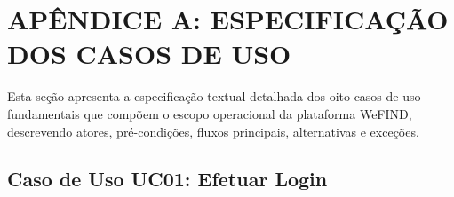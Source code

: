 \section*{APÊNDICE A: ESPECIFICAÇÃO DOS CASOS DE USO}

Esta seção apresenta a especificação textual detalhada dos oito casos de uso fundamentais que compõem o escopo operacional da plataforma WeFIND, descrevendo atores, pré-condições, fluxos principais, alternativas e exceções.

\vspace{0.5cm}

\subsection*{Caso de Uso UC01: Efetuar Login}
\noindent
